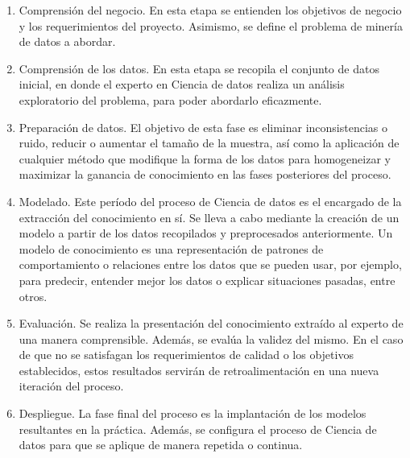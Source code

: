 \documentclass[c5paper,10pt,twoside]{book}	   	%
\begin{document}
\begin{enumerate}
	\item Comprensión del negocio. En esta etapa se entienden los objetivos de negocio y los requerimientos del proyecto. Asimismo, se define el problema de minería de datos a abordar.
	
	\item Comprensión de los datos. En esta etapa se recopila el conjunto de datos inicial, en donde el experto en Ciencia de datos realiza un análisis exploratorio del problema, para poder abordarlo eficazmente.
	
	\item Preparación de datos. El objetivo de esta fase es eliminar inconsistencias o ruido, reducir o aumentar el tamaño de la muestra, así como la aplicación de cualquier método que modifique la forma de los datos para homogeneizar y maximizar la ganancia de conocimiento en las fases posteriores del proceso.
	
	\item Modelado. Este período del proceso de Ciencia de datos es el encargado de la extracción del conocimiento en sí. Se lleva a cabo mediante la creación de un modelo a partir de los datos recopilados y preprocesados anteriormente. Un modelo de conocimiento es una representación de patrones de comportamiento o relaciones entre los datos que se pueden usar, por ejemplo, para predecir, entender mejor los datos o explicar situaciones pasadas, entre otros.
	
	\item Evaluación. Se realiza la presentación del conocimiento extraído al experto de una manera comprensible. Además, se evalúa la validez del mismo. En el caso de que no se satisfagan los requerimientos de calidad o los objetivos establecidos, estos resultados servirán de retroalimentación en una nueva iteración del proceso.
	
	\item Despliegue. La fase final del proceso es la implantación de los modelos resultantes en la práctica. Además, se configura el proceso de Ciencia de datos para que se aplique de manera repetida o continua.
\end{enumerate}
\end{document}

